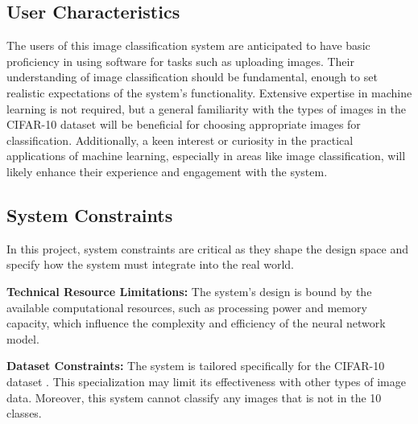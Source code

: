 \documentclass[12pt]{article}
\begin{document}
\subsection{User Characteristics} \label{SecUserCharacteristics}

The users of this image classification system are anticipated to have basic proficiency 
in using software for tasks such as uploading images. Their understanding of image 
classification should be fundamental, enough to set realistic expectations of the system's 
functionality. Extensive expertise in machine learning is not required, but a general familiarity 
with the types of images in the CIFAR-10 dataset \cite{CIFAR} will be beneficial for choosing appropriate 
images for classification. Additionally, a keen interest or curiosity in the practical applications 
of machine learning, especially in areas like image classification, will likely enhance their experience 
and engagement with the system.

\subsection{System Constraints}

In this project, system constraints are critical as they shape the design space and specify how 
the system must integrate into the real world.

\begin{inparaitem}
  \textbf{Technical Resource Limitations:} The system's design is bound by the available computational 
  resources, such as processing power and memory capacity, which influence the complexity and 
  efficiency of the neural network model.

  \textbf{Dataset Constraints:} The system is tailored specifically for the CIFAR-10 dataset \cite{CIFAR}. 
  This specialization may limit its effectiveness with other types of image data.
  Moreover, this system cannot classify any images that is not in the 10 classes.
\end{inparaitem}
\end{document}

